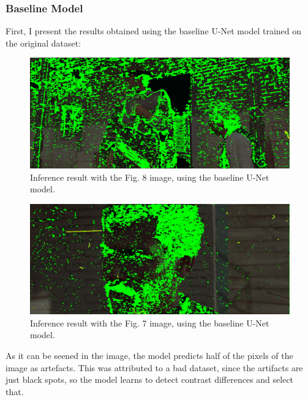 \documentclass[openany, 12pt]{article}
\begin{document}
\subsubsection*{Baseline Model}
First, I present the results obtained using the baseline U-Net model trained on the original dataset:
\begin{figure}[h!]
\centering
\includegraphics[width=0.7\linewidth]{images/punado_dollars_frame_0122.png_mask_30_epochs_unet_28.png_comparaison.png}
\caption{\smaller Inference result with the Fig. 8 image, using the baseline U-Net model.} 
\end{figure}
\begin{figure}[h!]
	\centering
	\includegraphics[width=0.7\linewidth]{images/punado_dollars_frame_0084.png_mask_30_epochs_unet_25.png_comparaison.png}
	\caption{\smaller Inference result with the Fig. 7 image, using the baseline U-Net model.} 
\end{figure}
As it can be seened in the image, the model predicts half of the pixels of the image as artefacts. This was attributed to a bad dataset, since the artifacts are just black spots, so the model learns to detect contrast differences and select that. 
\newpage
\end{document}
